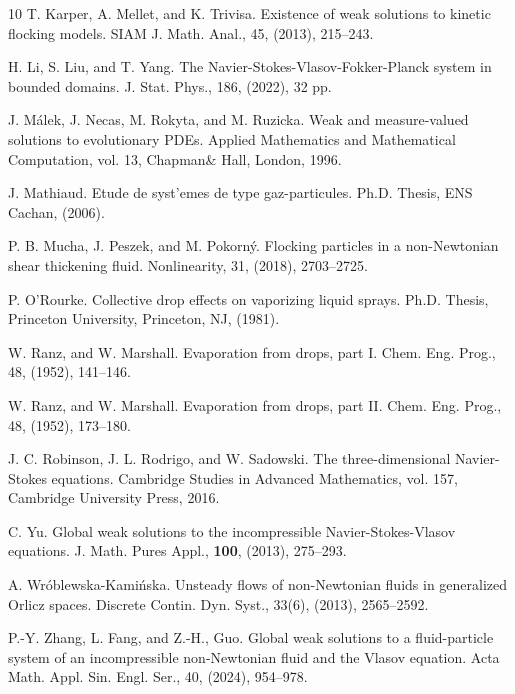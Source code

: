 \documentclass[10pt,reqno]{amsart}
\numberwithin{equation}{section}
\begin{document}
\begin{thebibliography}{10}
 T. Karper, A. Mellet, and K. Trivisa. Existence of weak solutions to kinetic flocking models. SIAM J. Math. Anal., 45, (2013), 215--243.

 H. Li, S. Liu, and T. Yang. The Navier-Stokes-Vlasov-Fokker-Planck system in bounded domains. J. Stat. Phys., 186, (2022), 32 pp.

J. M\'alek, J. Necas, M. Rokyta, and M. Ruzicka. Weak and measure-valued solutions to evolutionary PDEs. Applied Mathematics and Mathematical Computation, vol. 13,  Chapman\& Hall, London, 1996.

 J. Mathiaud. Etude de syst'emes de type gaz-particules. Ph.D. Thesis, ENS Cachan, (2006).

 P. B. Mucha, J. Peszek, and M. Pokorn\'y. Flocking particles in a non-Newtonian shear thickening fluid. Nonlinearity, 31, (2018), 2703--2725. 

 P. O'Rourke. Collective drop effects on vaporizing liquid sprays. Ph.D. Thesis, Princeton University, Princeton, NJ, (1981).

 W. Ranz, and W. Marshall. Evaporation from drops, part I. Chem. Eng. Prog., 48, (1952), 141--146.

 W. Ranz, and W. Marshall. Evaporation from drops, part II. Chem. Eng. Prog., 48, (1952), 173--180.

 J. C. Robinson, J. L. Rodrigo, and W. Sadowski. The three-dimensional Navier-Stokes equations. Cambridge Studies in Advanced Mathematics, vol. 157, Cambridge University Press, 2016.

 C. Yu. Global weak solutions to the incompressible Navier-Stokes-Vlasov equations. J. Math. Pures Appl., {\bf 100}, (2013), 275--293.

 A. Wr\'oblewska-Kami\'nska.  Unsteady flows of non-Newtonian fluids in generalized Orlicz spaces.
Discrete Contin. Dyn. Syst., 33(6), (2013), 2565--2592.

 P.-Y. Zhang, L. Fang, and Z.-H., Guo. Global weak solutions to a fluid-particle system of an incompressible non-Newtonian fluid and the Vlasov equation. Acta Math. Appl. Sin. Engl. Ser., 40, (2024), 954--978.
\end{thebibliography}
\end{document}
